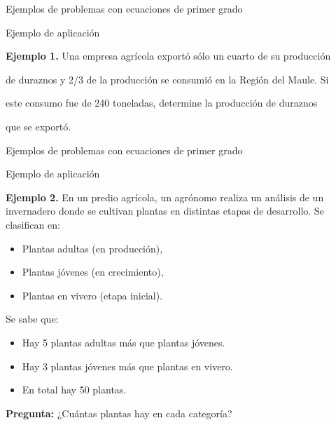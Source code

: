 \documentclass[10pt]{beamer}
\begin{document}
\begin{frame}{Ejemplos de problemas con ecuaciones de primer grado}

	\begin{block}{Ejemplo de aplicación}%
		
		\textbf{Ejemplo 1.} Una empresa agrícola exportó sólo un cuarto
		de su producción
		
		de duraznos y 2/3 de la producción se consumió en la Región del
		Maule. Si
		
		este consumo fue de 240 toneladas, determine la producción de duraznos
		
		que se exportó.
		
\end{block}%

\end{frame}%

\begin{frame}{Ejemplos de problemas con ecuaciones de primer grado}

	\begin{block}{Ejemplo de aplicación}%
		
		\textbf{Ejemplo 2.} En un predio agrícola, un agrónomo realiza un análisis de un invernadero donde se cultivan plantas en distintas etapas de desarrollo. Se clasifican en:
		
		\begin{itemize}
			\item Plantas adultas (en producción),
			\item Plantas jóvenes (en crecimiento),
			\item Plantas en vivero (etapa inicial).
		\end{itemize}
		
		Se sabe que:
		
		\begin{itemize}
			\item Hay 5 plantas adultas más que plantas jóvenes.
			\item Hay 3 plantas jóvenes más que plantas en vivero.
			\item En total hay 50 plantas.
		\end{itemize}
		
		\textbf{Pregunta:} ¿Cuántas plantas hay en cada categoría?
		
\end{block}%

\end{frame}%
\end{document}
